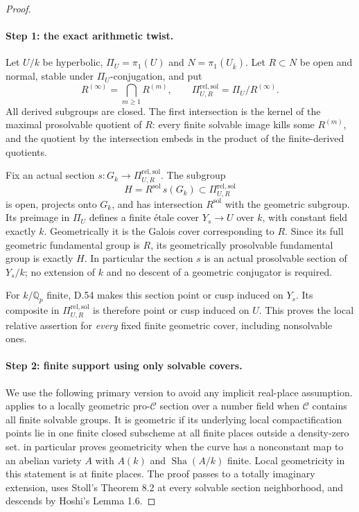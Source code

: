 \begin{proof}
\paragraph{Step 1: the exact arithmetic twist.}

Let $U/k$ be hyperbolic, $\Pi_U=\pi_1(U)$ and
$N=\pi_1(U_{\bar k})$.  Let $R\subset N$ be open and normal,
stable under $\Pi_U$-conjugation, and put
\[
 R^{(\infty)}=\bigcap_{m\ge1}R^{(m)},\qquad
 \Pi_{U,R}^{\mathrm{rel,sol}}
      =\Pi_U/R^{(\infty)}.
\]
All derived subgroups are closed.  The first intersection is the
kernel of the maximal prosolvable quotient of $R$: every finite
solvable image kills some $R^{(m)}$, and the quotient by the
intersection embeds in the product of the finite-derived quotients.

Fix an actual section $s:G_k\to\Pi_{U,R}^{\mathrm{rel,sol}}$.
The subgroup
\[
             H=R^{\mathrm{sol}}\,s(G_k)
                 \subset\Pi_{U,R}^{\mathrm{rel,sol}}
\]
is open, projects onto $G_k$, and has intersection
$R^{\mathrm{sol}}$ with the geometric subgroup.  Its preimage in
$\Pi_U$ defines a finite \'etale cover $Y_s\to U$ over $k$, with
constant field exactly $k$.  Geometrically it is the Galois cover
corresponding to $R$.  Since its full geometric fundamental group
is $R$, its geometrically prosolvable fundamental group is exactly
$H$.  In particular the section $s$ is an actual prosolvable section
of $Y_s/k$; no extension of $k$ and no descent of a geometric
conjugator is required.

For $k/\mathbb Q_p$ finite, D.54 makes this section
point or cusp induced on $Y_s$.  Its composite in
$\Pi_{U,R}^{\mathrm{rel,sol}}$ is therefore point or cusp induced
on $U$.  This proves the local relative assertion for \emph{every}
fixed finite geometric cover, including nonsolvable ones.

\paragraph{Step 2: finite support using only solvable covers.}

We use the following primary version to avoid any implicit real-place
assumption.  \cite[Theorem 4.1]{DE_Hoshi2012} applies to a locally
geometric pro-$\mathcal C$ section over a number field when
$\mathcal C$ contains all finite solvable groups.  It is geometric
if its underlying local compactification points lie in one finite
closed subscheme at all finite places outside a density-zero set.
\cite[Corollary 4.2]{DE_Hoshi2012} in particular proves geometricity when the curve
has a nonconstant map to an abelian variety $A$ with $A(k)$ and
$\operatorname{Sha}(A/k)$ finite.  Local geometricity in this statement is at
finite places.  The proof passes to a totally imaginary extension,
uses Stoll's Theorem 8.2 at every solvable section neighborhood,
and descends by Hoshi's Lemma 1.6.


\end{proof}
